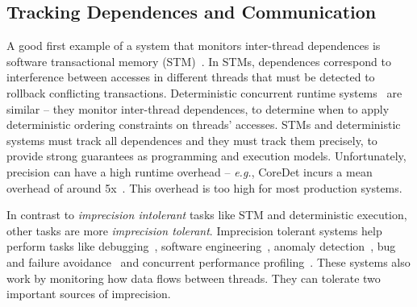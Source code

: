 \documentclass[preprint,9pt]{sigplanconf}
\newcommand{\ctraps}{CTraps\xspace}
\begin{document}

\subsection{Tracking Dependences and Communication}
\label{sec:background:comm}

A good first example of a system that monitors inter-thread dependences is
software transactional memory (STM)~\cite{stm}.  In STMs, dependences
correspond to interference between accesses in different threads that must be
detected to rollback conflicting transactions.  Deterministic concurrent
runtime systems~\cite{coredet,grace} are similar -- they monitor
inter-thread dependences, to determine when to apply deterministic ordering
constraints on threads' accesses.  STMs and deterministic systems must track
all dependences and they must track them precisely, to provide strong
guarantees as programming and execution models.  Unfortunately, precision can
have a high runtime overhead -- {\em e.g.}, CoreDet incurs a mean overhead of
around 5x~\cite{coredet}.  This overhead is too high for most production
systems.  


In contrast to {\em imprecision intolerant} tasks like STM and deterministic
execution, other tasks are more {\em imprecision tolerant}.  Imprecision
tolerant systems help perform tasks like
debugging~\cite{defuse,conseq,recon,bugaboo,raceslicing,fasttrack,falcon},
software engineering~\cite{oshajava,oshatr}, anomaly
detection~\cite{avio,dmtracker,cci,daikon}, bug and failure
avoidance~\cite{aviso,cfix} and concurrent performance
profiling~\cite{threadcriticality,schedpredictionmodel}.  These
systems also work by monitoring how data flows between threads.  They can
tolerate two important sources of imprecision.
\end{document}
